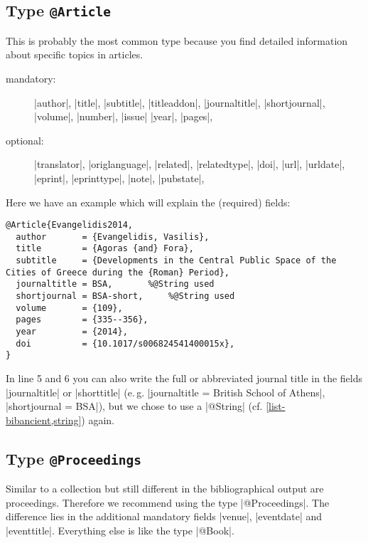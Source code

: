 \documentclass[a4paper,
10pt,
greek,
french,
spanish,
italian,
ngerman,
english
]{ltxdoc}
\begin{document}
\begin{refsection}\end{refsection}


\subsection{Type \texttt{@Article}}\label{article}
 This is probably the most common type 
because you find detailed information about specific topics in articles.

\begin{description}
\item[mandatory:] 
|author|, |title|, |subtitle|, |titleaddon|,
|journaltitle|, |shortjournal|, |volume|, |number|, |issue|
|year|, |pages|, 
\item[optional:]
|translator|, |origlanguage|,
|related|, |relatedtype|,
|doi|, |url|, |urldate|, |eprint|, |eprinttype|, |note|, |pubstate|, 
 \end{description}

Here we have an example which will explain the (required)  fields:
\begin{lstlisting}[style=bibentry,label=Evangelidis2014,caption={{@}Article\{Evangelidis2014,…\} }]
@Article{Evangelidis2014,
  author       = {Evangelidis, Vasilis},
  title        = {Agoras {and} Fora},
  subtitle     = {Developments in the Central Public Space of the Cities of Greece during the {Roman} Period},
  journaltitle = BSA,		%@String used
  shortjournal = BSA-short,		%@String used
  volume       = {109},
  pages        = {335--356},
  year         = {2014},
  doi          = {10.1017/s006824541400015x},
}
\end{lstlisting}
In line 5 and 6 you can also write the full or abbreviated journal title in the fields |journaltitle| or |shorttitle| (e.\,g. |journaltitle = {British School of Athens}|, |shortjournal = {BSA}|), but we chose to use a |@String| (cf. \cref{list-bibancient,string}) again.


\subsection{Type \texttt{@Proceedings}}\label{proceedings}
Similar to a collection but still different in the bibliographical output are proceedings.
Therefore we recommend  using the type |@Proceedings|.
The difference lies in the additional mandatory fields |venue|, |eventdate| and |eventtitle|. 
Everything else is like the type |@Book|.
\end{document}
